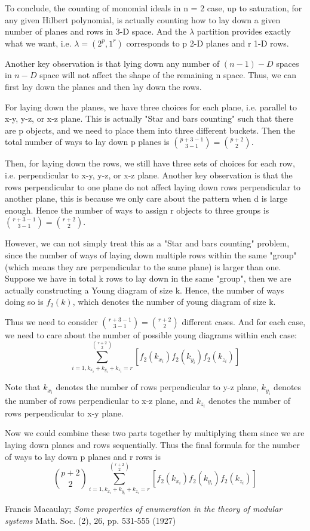 \documentclass[11pt]{amsart} %
\theoremstyle{plain} %
\theoremstyle{definition} %
\begin{document}
To conclude, the counting of monomial ideals in n = 2 case, up to saturation, for any given Hilbert polynomial, is actually counting how to lay down a given number of planes and rows in 3-D space. And the \(\lambda\) partition provides exactly what we want, i.e. \(\lambda = (2^p, 1^r)\) corresponds to p 2-D planes and r 1-D rows.

Another key observation is that lying down any number of \((n - 1)-D\) spaces in \(n-D\) space will not affect the shape of the remaining n space. Thus, we can first lay down the planes and then lay down the rows.

For laying down the planes, we have three choices for each plane, i.e. parallel to x-y, y-z, or x-z plane. This is actually "Star and bars counting" such that there are p objects, and we need to place them into three different buckets. Then the total number of ways to lay down p planes is \(\binom{p + 3 - 1}{3 - 1} = \binom{p + 2}{2}\).

Then, for laying down the rows, we still have three sets of choices for each row, i.e. perpendicular to x-y, y-z, or x-z plane. Another key observation is that the rows perpendicular to one plane do not affect laying down rows perpendicular to another plane, this is because we only care about the pattern when d is large enough. Hence the number of ways to assign r objects to three groups is \(\binom{r + 3 - 1}{3 - 1} = \binom{r + 2}{2}\).

However, we can not simply treat this as a "Star and bars counting" problem, since the number of ways of laying down multiple rows within the same "group" (which means they are perpendicular to the same plane) is larger than one. Suppose we have in total k rows to lay down in the same "group", then we are actually constructing a Young diagram of size k. Hence, the number of ways doing so is \(f_2(k)\), which denotes the number of young diagram of size k.

Thus we need to consider \(\binom{r + 3 - 1}{3 - 1} = \binom{r + 2}{2}\) different cases. And for each case, we need to care about the number of possible young diagrams within each case:
$$\sum_{i=1, k_{x_i} + k_{y_i} + k_{z_i} = r}^{\binom{r+2}{2}}\left[f_{2}(k_{x_i})f_{2}(k_{y_i})f_{2}(k_{z_i})\right]$$

Note that \(k_{x_i}\) denotes the number of rows perpendicular to y-z plane, \(k_{y_i}\) denotes the number of rows perpendicular to x-z plane, and \(k_{z_i}\) denotes the number of rows perpendicular to x-y plane.

Now we could combine these two parts together by multiplying them since we are laying down planes and rows sequentially. Thus the final formula for the number of ways to lay down p planes and r rows is
$$\binom{p+2}{2}\sum_{i=1, k_{x_i} + k_{y_i} + k_{z_i} = r}^{\binom{r+2}{2}}\left[f_{2}(k_{x_i})f_{2}(k_{y_i})f_{2}(k_{z_i})\right]$$

\newpage
\thispagestyle{plain}
\begin{thebibliography}{9}
    Francis Macaulay; {\it Some properties of enumeration in the theory of modular systems} Math. Soc. (2), 26, pp. 531-555 (1927)
\end{thebibliography}
\end{document}
